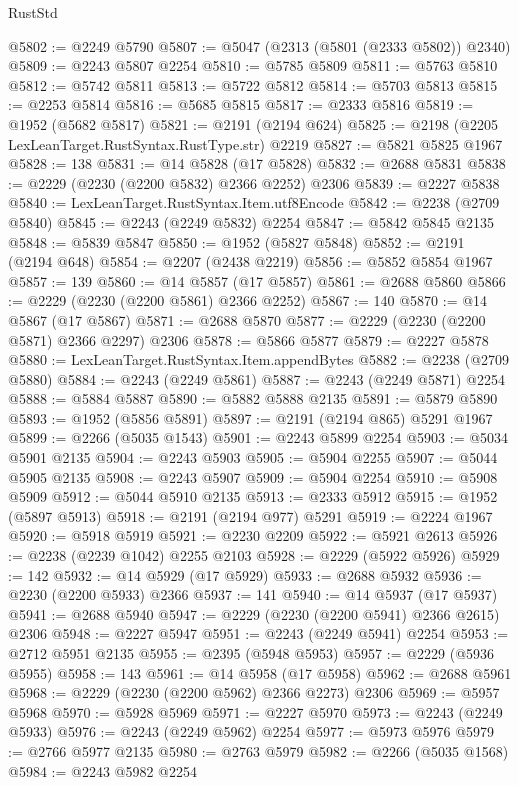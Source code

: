 \begin{lexlean}{RustStd}
\begin{coremodule}
@5802 := @2249 @5790
@5807 := @5047 (@2313 (@5801 (@2333 @5802)) @2340)
@5809 := @2243 @5807 @2254
@5810 := @5785 @5809
@5811 := @5763 @5810
@5812 := @5742 @5811
@5813 := @5722 @5812
@5814 := @5703 @5813
@5815 := @2253 @5814
@5816 := @5685 @5815
@5817 := @2333 @5816
@5819 := @1952 (@5682 @5817)
@5821 := @2191 (@2194 @624)
@5825 := @2198 (@2205 LexLeanTarget.RustSyntax.RustType.str) @2219
@5827 := @5821 @5825 @1967
@5828 := 138
@5831 := @14 @5828 (@17 @5828)
@5832 := @2688 @5831
@5838 := @2229 (@2230 (@2200 @5832) @2366 @2252) @2306
@5839 := @2227 @5838
@5840 := LexLeanTarget.RustSyntax.Item.utf8Encode
@5842 := @2238 (@2709 @5840)
@5845 := @2243 (@2249 @5832) @2254
@5847 := @5842 @5845 @2135
@5848 := @5839 @5847
@5850 := @1952 (@5827 @5848)
@5852 := @2191 (@2194 @648)
@5854 := @2207 (@2438 @2219)
@5856 := @5852 @5854 @1967
@5857 := 139
@5860 := @14 @5857 (@17 @5857)
@5861 := @2688 @5860
@5866 := @2229 (@2230 (@2200 @5861) @2366 @2252)
@5867 := 140
@5870 := @14 @5867 (@17 @5867)
@5871 := @2688 @5870
@5877 := @2229 (@2230 (@2200 @5871) @2366 @2297) @2306
@5878 := @5866 @5877
@5879 := @2227 @5878
@5880 := LexLeanTarget.RustSyntax.Item.appendBytes
@5882 := @2238 (@2709 @5880)
@5884 := @2243 (@2249 @5861)
@5887 := @2243 (@2249 @5871) @2254
@5888 := @5884 @5887
@5890 := @5882 @5888 @2135
@5891 := @5879 @5890
@5893 := @1952 (@5856 @5891)
@5897 := @2191 (@2194 @865) @5291 @1967
@5899 := @2266 (@5035 @1543)
@5901 := @2243 @5899 @2254
@5903 := @5034 @5901 @2135
@5904 := @2243 @5903
@5905 := @5904 @2255
@5907 := @5044 @5905 @2135
@5908 := @2243 @5907
@5909 := @5904 @2254
@5910 := @5908 @5909
@5912 := @5044 @5910 @2135
@5913 := @2333 @5912
@5915 := @1952 (@5897 @5913)
@5918 := @2191 (@2194 @977) @5291
@5919 := @2224 @1967
@5920 := @5918 @5919
@5921 := @2230 @2209
@5922 := @5921 @2613
@5926 := @2238 (@2239 @1042) @2255 @2103
@5928 := @2229 (@5922 @5926)
@5929 := 142
@5932 := @14 @5929 (@17 @5929)
@5933 := @2688 @5932
@5936 := @2230 (@2200 @5933) @2366
@5937 := 141
@5940 := @14 @5937 (@17 @5937)
@5941 := @2688 @5940
@5947 := @2229 (@2230 (@2200 @5941) @2366 @2615) @2306
@5948 := @2227 @5947
@5951 := @2243 (@2249 @5941) @2254
@5953 := @2712 @5951 @2135
@5955 := @2395 (@5948 @5953)
@5957 := @2229 (@5936 @5955)
@5958 := 143
@5961 := @14 @5958 (@17 @5958)
@5962 := @2688 @5961
@5968 := @2229 (@2230 (@2200 @5962) @2366 @2273) @2306
@5969 := @5957 @5968
@5970 := @5928 @5969
@5971 := @2227 @5970
@5973 := @2243 (@2249 @5933)
@5976 := @2243 (@2249 @5962) @2254
@5977 := @5973 @5976
@5979 := @2766 @5977 @2135
@5980 := @2763 @5979
@5982 := @2266 (@5035 @1568)
@5984 := @2243 @5982 @2254

\end{coremodule}
\end{lexlean}
